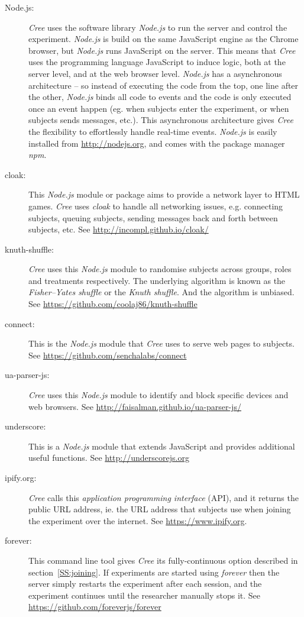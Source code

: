 \documentclass[preprint, 12pt]{elsarticle}
\newcommand{\Cree}{\emph{Cree}\xspace}
\begin{document}
\begin{description}
  \item[Node.js:] \Cree uses the software library \emph{Node.js} to run the server and control the experiment. \emph{Node.js} is build on the same JavaScript engine as the Chrome browser, but \emph{Node.js} runs JavaScript on the server. This means that \Cree uses the programming language JavaScript to induce logic, both at the server level, and at the web browser level. \emph{Node.js} has a asynchronous architecture -- so instead of executing the code from the top, one line after the other, \emph{Node.js} binds all code to events and the code is only executed once an event happen (eg. when subjects enter the experiment, or when subjects sends messages, etc.). This asynchronous architecture gives \Cree the flexibility to effortlessly handle real-time events. \emph{Node.js} is easily installed from \url{http://nodejs.org}, and comes with the package manager \emph{npm}.
  \item[cloak:] This \emph{Node.js} module or package aims to provide a network layer to HTML games. \Cree uses \emph{cloak} to handle all networking issues, e.g. connecting subjects, queuing subjects, sending messages back and forth between subjects, etc. See \url{http://incompl.github.io/cloak/}
  \item[knuth-shuffle:] \Cree uses this \emph{Node.js} module to randomise subjects across groups, roles and treatments respectively. The underlying algorithm is known as the \emph{Fisher–Yates shuffle} or the \emph{Knuth shuffle}. And the algorithm is unbiased. See \url{https://github.com/coolaj86/knuth-shuffle}
  \item[connect:] This is the \emph{Node.js} module that \Cree uses to serve web pages to subjects. See \url{https://github.com/senchalabs/connect}
  \item[ua-parser-js:] \Cree uses this \emph{Node.js} module to identify and block specific devices and web browsers. See \url{http://faisalman.github.io/ua-parser-js/}
  \item[underscore:] This is a \emph{Node.js} module that extends JavaScript and provides additional useful functions. See \url{http://underscorejs.org}
  \item[ipify.org:] \Cree calls this \emph{application programming interface} (API), and it returns the public URL address, ie. the URL address that subjects use when joining the experiment over the internet. See \url{https://www.ipify.org}.
  \item[forever:] This command line tool gives \Cree its fully-continuous option described in section~\ref{SS:joining}. If experiments are started using \emph{forever} then the server simply restarts the experiment after each session, and the experiment continues until the researcher manually stops it. See \url{https://github.com/foreverjs/forever}

\end{description}
\end{document}
